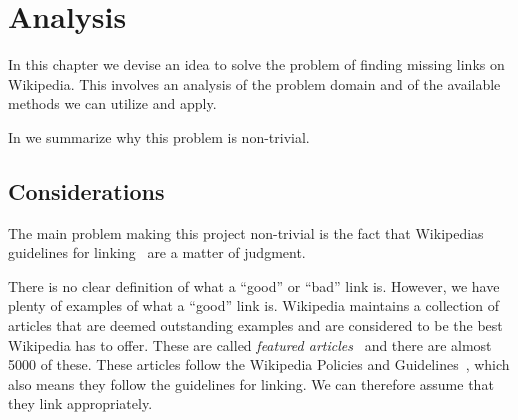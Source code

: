 \chapter{Analysis}\label{chap:idea}
In this chapter we devise an idea to solve the problem of finding missing links on Wikipedia. This involves an analysis of the problem domain and of the available methods we can utilize and apply.

\begin{chapterorganization}
  \item In  we summarize why this problem is non-trivial.
 
\end{chapterorganization}

\section{Considerations}\label{sec:analconsiderations}
The main problem making this project non-trivial is the fact that Wikipedias guidelines for linking~\cite{wiki-manual-of-style-overlinking} are a matter of judgment. 

There is no clear definition of what a ``good'' or ``bad'' link is. However, we have plenty of examples of what a ``good'' link is.
Wikipedia maintains a collection of articles that are deemed outstanding examples and are considered to be the best Wikipedia has to offer. These are called \emph{featured articles}~\cite{wiki-featured-articles} and there are almost 5000 of these. These articles follow the Wikipedia Policies and Guidelines~\cite{wiki-editor-guidelines}, which also means they follow the guidelines for linking. We can therefore assume that they link appropriately.



